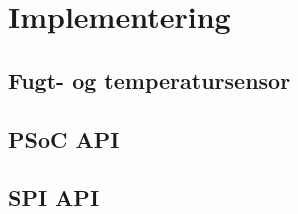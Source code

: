 \chapter{Implementering}


\section{Fugt- og temperatursensor}


\section{PSoC API}


\section{SPI API}



